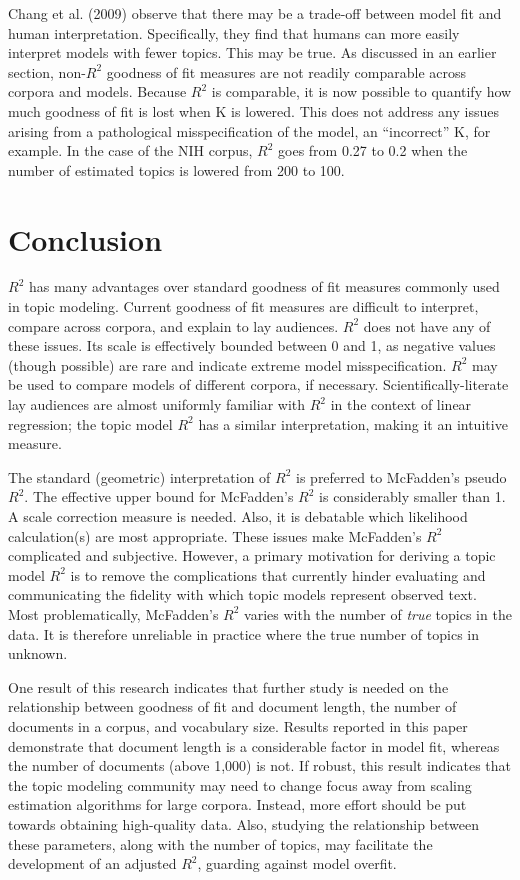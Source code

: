 \documentclass[conference,final,]{IEEEtran}
\begin{document}
Chang et al. (2009) observe that there may be a trade-off between model
fit and human interpretation. Specifically, they find that humans can
more easily interpret models with fewer topics. This may be true. As
discussed in an earlier section, non-\(R^2\) goodness of fit measures
are not readily comparable across corpora and models. Because \(R^2\) is
comparable, it is now possible to quantify how much goodness of fit is
lost when K is lowered. This does not address any issues arising from a
pathological misspecification of the model, an ``incorrect'' K, for
example. In the case of the NIH corpus, \(R^2\) goes from 0.27 to 0.2
when the number of estimated topics is lowered from 200 to 100.

\hypertarget{conclusion}{%
\section{Conclusion}\label{conclusion}}

\(R^2\) has many advantages over standard goodness of fit measures
commonly used in topic modeling. Current goodness of fit measures are
difficult to interpret, compare across corpora, and explain to lay
audiences. \(R^2\) does not have any of these issues. Its scale is
effectively bounded between 0 and 1, as negative values (though
possible) are rare and indicate extreme model misspecification. \(R^2\)
may be used to compare models of different corpora, if necessary.
Scientifically-literate lay audiences are almost uniformly familiar with
\(R^2\) in the context of linear regression; the topic model \(R^2\) has
a similar interpretation, making it an intuitive measure.

The standard (geometric) interpretation of \(R^2\) is preferred to
McFadden's pseudo \(R^2\). The effective upper bound for McFadden's
\(R^2\) is considerably smaller than 1. A scale correction measure is
needed. Also, it is debatable which likelihood calculation(s) are most
appropriate. These issues make McFadden's \(R^2\) complicated and
subjective. However, a primary motivation for deriving a topic model
\(R^2\) is to remove the complications that currently hinder evaluating
and communicating the fidelity with which topic models represent
observed text. Most problematically, McFadden's \(R^2\) varies with the
number of \textit{true} topics in the data. It is therefore unreliable
in practice where the true number of topics in unknown.

One result of this research indicates that further study is needed on
the relationship between goodness of fit and document length, the number
of documents in a corpus, and vocabulary size. Results reported in this
paper demonstrate that document length is a considerable factor in model
fit, whereas the number of documents (above 1,000) is not. If robust,
this result indicates that the topic modeling community may need to
change focus away from scaling estimation algorithms for large corpora.
Instead, more effort should be put towards obtaining high-quality data.
Also, studying the relationship between these parameters, along with the
number of topics, may facilitate the development of an adjusted \(R^2\),
guarding against model overfit.
\end{document}
